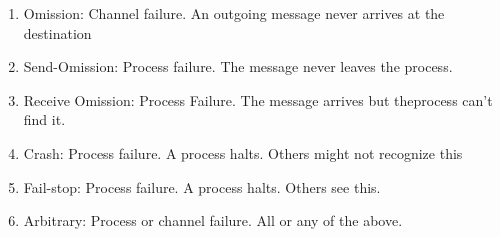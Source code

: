\begin{enumerate}
\item Omission: Channel failure. An outgoing message never arrives at the destination
 
\item Send-Omission: Process failure. The message never leaves the process.
 
\item Receive Omission: Process Failure. The message arrives but theprocess can't find it.
 
\item Crash: Process failure. A process halts. Others might not recognize this
 
\item Fail-stop: Process failure. A process halts. Others see this.
 
\item Arbitrary: Process or channel failure. All or any of the above.

\end{enumerate}

